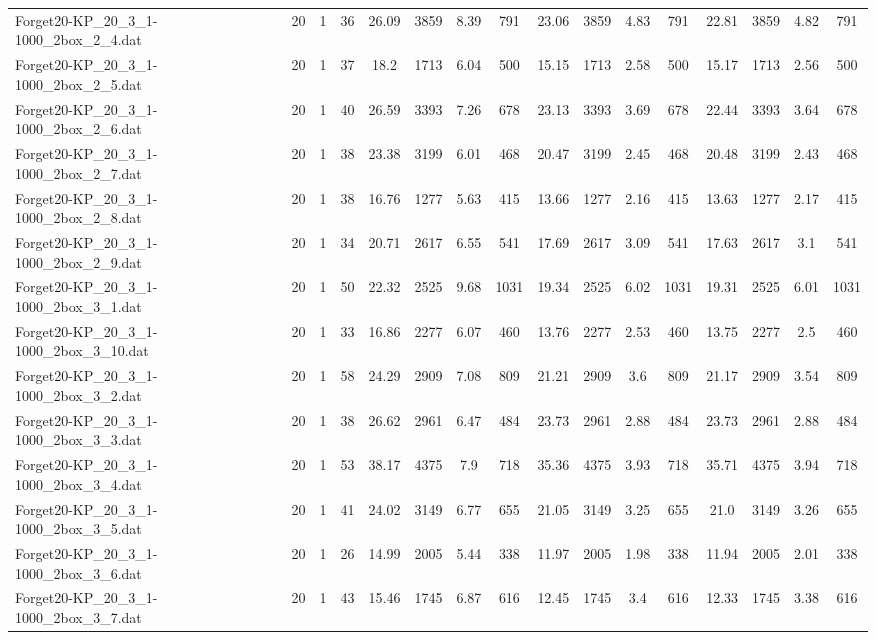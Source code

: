 \begin{sidewaystable}[!ht]
{\begin{tabular}{lccccccccccccccc}
Forget20-KP\_20\_3\_1-1000\_2box\_2\_4.dat & 20 & 1 & 36 & 26.09 & 3859 & 8.39 & 791 & 23.06 & 3859 & 4.83 & 791 & 22.81 & 3859 & 4.82 & 791 \\
Forget20-KP\_20\_3\_1-1000\_2box\_2\_5.dat & 20 & 1 & 37 & 18.2 & 1713 & 6.04 & 500 & 15.15 & 1713 & 2.58 & 500 & 15.17 & 1713 &  \textcolor{blue2}{2.56} & 500 \\
Forget20-KP\_20\_3\_1-1000\_2box\_2\_6.dat & 20 & 1 & 40 & 26.59 & 3393 & 7.26 & 678 & 23.13 & 3393 & 3.69 & 678 & 22.44 & 3393 & 3.64 & 678 \\
Forget20-KP\_20\_3\_1-1000\_2box\_2\_7.dat & 20 & 1 & 38 & 23.38 & 3199 & 6.01 & 468 & 20.47 & 3199 & 2.45 & 468 & 20.48 & 3199 & 2.43 & 468 \\
Forget20-KP\_20\_3\_1-1000\_2box\_2\_8.dat & 20 & 1 & 38 & 16.76 & 1277 & 5.63 & 415 & 13.66 & 1277 & 2.16 & 415 & 13.63 & 1277 & 2.17 & 415 \\
Forget20-KP\_20\_3\_1-1000\_2box\_2\_9.dat & 20 & 1 & 34 & 20.71 & 2617 & 6.55 & 541 & 17.69 & 2617 & 3.09 & 541 & 17.63 & 2617 & 3.1 & 541 \\
Forget20-KP\_20\_3\_1-1000\_2box\_3\_1.dat & 20 & 1 & 50 & 22.32 & 2525 & 9.68 & 1031 & 19.34 & 2525 & 6.02 & 1031 & 19.31 & 2525 &  \textcolor{blue2}{6.01} & 1031 \\
Forget20-KP\_20\_3\_1-1000\_2box\_3\_10.dat & 20 & 1 & 33 & 16.86 & 2277 & 6.07 & 460 & 13.76 & 2277 & 2.53 & 460 & 13.75 & 2277 & 2.5 & 460 \\
Forget20-KP\_20\_3\_1-1000\_2box\_3\_2.dat & 20 & 1 & 58 & 24.29 & 2909 & 7.08 & 809 & 21.21 & 2909 & 3.6 & 809 & 21.17 & 2909 & 3.54 & 809 \\
Forget20-KP\_20\_3\_1-1000\_2box\_3\_3.dat & 20 & 1 & 38 & 26.62 & 2961 & 6.47 & 484 & 23.73 & 2961 & 2.88 & 484 & 23.73 & 2961 & 2.88 & 484 \\
Forget20-KP\_20\_3\_1-1000\_2box\_3\_4.dat & 20 & 1 & 53 & 38.17 & 4375 & 7.9 & 718 & 35.36 & 4375 & 3.93 & 718 & 35.71 & 4375 & 3.94 & 718 \\
Forget20-KP\_20\_3\_1-1000\_2box\_3\_5.dat & 20 & 1 & 41 & 24.02 & 3149 & 6.77 & 655 & 21.05 & 3149 & 3.25 & 655 & 21.0 & 3149 & 3.26 & 655 \\
Forget20-KP\_20\_3\_1-1000\_2box\_3\_6.dat & 20 & 1 & 26 & 14.99 & 2005 & 5.44 & 338 & 11.97 & 2005 & 1.98 & 338 & 11.94 & 2005 & 2.01 & 338 \\
Forget20-KP\_20\_3\_1-1000\_2box\_3\_7.dat & 20 & 1 & 43 & 15.46 & 1745 & 6.87 & 616 & 12.45 & 1745 & 3.4 & 616 & 12.33 & 1745 & 3.38 & 616 \\

\end{tabular}}
\end{sidewaystable}
